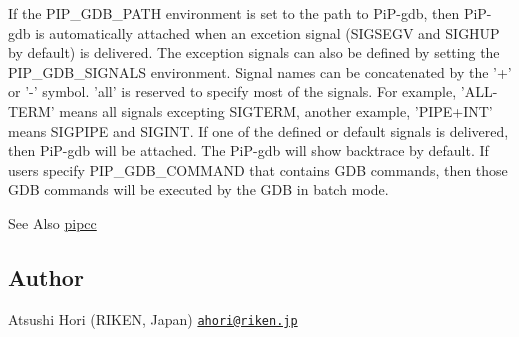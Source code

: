 If the P\-I\-P\-\_\-\-G\-D\-B\-\_\-\-P\-A\-T\-H environment is set to the path to Pi\-P-\/gdb, then Pi\-P-\/gdb is automatically attached when an excetion signal (S\-I\-G\-S\-E\-G\-V and S\-I\-G\-H\-U\-P by default) is delivered. The exception signals can also be defined by setting the P\-I\-P\-\_\-\-G\-D\-B\-\_\-\-S\-I\-G\-N\-A\-L\-S environment. Signal names can be concatenated by the '+' or '-\/' symbol. 'all' is reserved to specify most of the signals. For example, 'A\-L\-L-\/\-T\-E\-R\-M' means all signals excepting S\-I\-G\-T\-E\-R\-M, another example, 'P\-I\-P\-E+\-I\-N\-T' means S\-I\-G\-P\-I\-P\-E and S\-I\-G\-I\-N\-T. If one of the defined or default signals is delivered, then Pi\-P-\/gdb will be attached. The Pi\-P-\/gdb will show backtrace by default. If users specify P\-I\-P\-\_\-\-G\-D\-B\-\_\-\-C\-O\-M\-M\-A\-N\-D that contains G\-D\-B commands, then those G\-D\-B commands will be executed by the G\-D\-B in batch mode.

\begin{DoxySeeAlso}{See Also}
\hyperlink{group__pipcc}{pipcc}
\end{DoxySeeAlso}
\hypertarget{group__pip-overview_author}{}\subsection{Author}\label{group__pip-overview_author}
Atsushi Hori (R\-I\-K\-E\-N, Japan) \href{mailto:ahori@riken.jp}{\tt ahori@riken.\-jp} 
